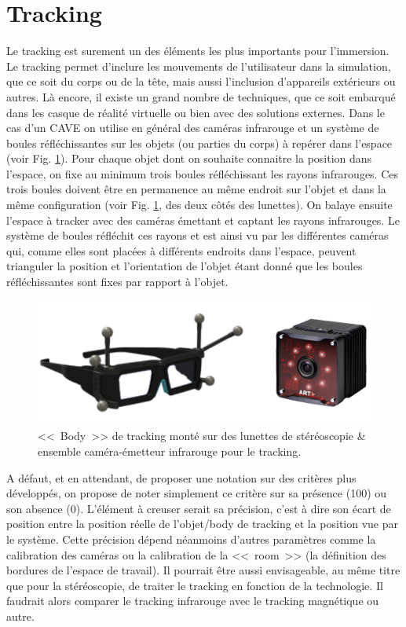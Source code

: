 	\section{Tracking}
	\par Le tracking est surement un des éléments les plus importants pour l'immersion. Le tracking permet d'inclure les mouvements de l'utilisateur dans la simulation, que ce soit du corps ou de la tête, mais aussi l'inclusion d'appareils extérieurs ou autres. Là encore, il existe un grand nombre de techniques, que ce soit embarqué dans les casque de réalité virtuelle ou bien avec des solutions externes. Dans le cas d'un CAVE on utilise en général des caméras infrarouge et un système de boules réfléchissantes sur les objets (ou parties du corps) à repérer dans l'espace (voir Fig. \ref{fig:tracking_illustration}). Pour chaque objet dont on souhaite connaitre la position dans l'espace, on fixe au minimum trois boules réfléchissant les rayons infrarouges. Ces trois boules doivent être en permanence au même endroit sur l'objet et dans la même configuration (voir Fig. \ref{fig:tracking_illustration}, des deux côtés des lunettes). On balaye ensuite l'espace à tracker avec des caméras émettant et captant les rayons infrarouges. Le système de boules réfléchit ces rayons et est ainsi vu par les différentes caméras qui, comme elles sont placées à différents endroits dans l'espace, peuvent trianguler la position et l'orientation de l'objet étant donné que les boules réfléchissantes sont fixes par rapport à l'objet.
	
	\begin{figure}
		\centering
		\includegraphics[scale=.6]{Figures/TrackingCameraBody}
		\caption{<<~Body~>> de tracking monté sur des lunettes de stéréoscopie \& ensemble caméra-émetteur infrarouge pour le tracking.}
		\label{fig:tracking_illustration}
	\end{figure}
	
	\par A défaut, et en attendant, de proposer une notation sur des critères plus développés, on propose de noter simplement ce critère sur sa présence (100) ou son absence (0). L'élément à creuser serait sa précision, c'est à dire son écart de position entre la position réelle de l'objet/body de tracking et la position vue par le système. Cette précision dépend néanmoins d'autres paramètres comme la calibration des caméras ou la calibration de la <<~room~>> (la définition des bordures de l'espace de travail). Il pourrait être aussi envisageable, au même titre que pour la stéréoscopie, de traiter le tracking en fonction de la technologie. Il faudrait alors comparer le tracking infrarouge avec le tracking magnétique ou autre.
		
